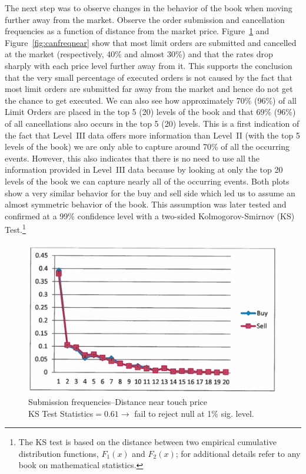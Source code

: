 The next step was to observe changes in the behavior of the book when moving further away from the market. Observe the order submission and cancellation frequencies as a function of distance from the market price. Figure~\ref{fig:subfreqnear} and Figure~\ref{fig:canfreqnear} show that most limit orders are submitted and cancelled at the market (respectively, 40\% and almost 30\%) and that the rates drop sharply with each price level further away from it. This supports the conclusion that the very small percentage of executed orders is not caused by the fact that most limit orders are submitted far away from the market and hence do not get the chance to get executed. We can also see how approximately 70\% (96\%) of all Limit Orders are placed in the top 5 (20) levels of the book and that 69\% (96\%) of all cancellations also occurs in the top 5 (20) levels. This is a first indication of the fact that Level~III data offers more information than Level~II  (with the top 5 levels of the book) we are only able to capture around 70\% of all the occurring events. However, this also indicates that there is no need to use all the information provided in Level~III data \label{in:level3dat3} because by looking at only the top 20 levels of the book we can capture nearly all of the occurring events. Both plots show a very similar behavior for the buy and sell side which led us to assume an almost symmetric behavior of the book. This assumption was later tested and confirmed at a 99\% confidence level with a two-sided Kolmogorov-Smirnov (KS) Test.\footnote{The KS test is based on the distance between two empirical cumulative distribution functions, $F_1(x)$ and $F_2(x)$; for additional details refer to any book on mathematical statistics.}
	\begin{figure}[!ht]
   	\centering
   	\includegraphics[width=\textwidth]{chapters/chapter_trade_data_models/figures/subfreqnear.png} 
   	\caption{Submission frequencies--Distance near touch price \\ KS Test Statistics$=0.61 \to$ fail to reject null at 1\% sig. level.\label{fig:subfreqnear}}
	\end{figure}
